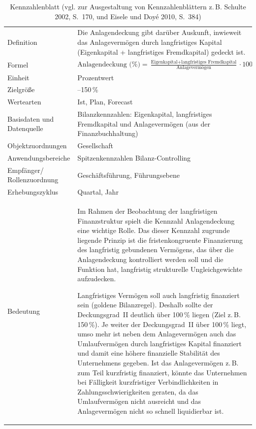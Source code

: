 \begin{table}[htbp]
  \centering
  \caption[Kennzahlenblatt]{Kennzahlenblatt (vgl. zur Ausgestaltung von Kennzahlenblättern z.\,B. Schulte 2002, S.~170, und Eisele und Doyé 2010, S.~384)}
  \label{tab:Kennzahlenblatt}
  \small
  \begin{tabularx}{\textwidth}{@{}>{\raggedright\arraybackslash}p{3.3cm}>{\raggedright\arraybackslash}X@{}}
    \toprule
    \multicolumn{2}{@{}l}{\textbf{Kennzahl: Anlagendeckung (\%)}} \\
    \midrule
    Definition & Die Anlagendeckung gibt darüber Auskunft, inwieweit das Anlagevermögen durch langfristiges Kapital (Eigenkapital + langfristiges Fremdkapital) gedeckt ist. \\
    \addlinespace
    Formel & $\displaystyle \text{Anlagendeckung (\%)} = \frac{\text{Eigenkapital} + \text{langfristiges Fremdkapital}}{\text{Anlagevermögen}} \cdot 100$ \\
    \addlinespace
    Einheit & Prozentwert \\
    Zielgröße & 110--150\,\% \\
    Wertearten & Ist, Plan, Forecast \\
    Basisdaten und Datenquelle & Bilanzkennzahlen: Eigenkapital, langfristiges Fremdkapital und Anlagevermögen (aus der Finanzbuchhaltung) \\
    Objektzuordnungen & Gesellschaft \\
    Anwendungsbereiche & Spitzenkennzahlen Bilanz-Controlling \\
    Empfänger/ Rollenzuordnung & Geschäftsführung, Führungsebene \\
    Erhebungszyklus & Quartal, Jahr \\
    \addlinespace
    Bedeutung & Im Rahmen der Beobachtung der langfristigen Finanzstruktur spielt die Kennzahl Anlagendeckung eine wichtige Rolle. Das dieser Kennzahl zugrunde liegende Prinzip ist die fristenkongruente Finanzierung des langfristig gebundenen Vermögens, das über die Anlagendeckung kontrolliert werden soll und die Funktion hat, langfristig strukturelle Ungleichgewichte aufzudecken.

    Langfristiges Vermögen soll auch langfristig finanziert sein (goldene Bilanzregel). Deshalb sollte der Deckungsgrad~II deutlich über 100\,\% liegen (Ziel z.\,B. 150\,\%). Je weiter der Deckungsgrad~II über 100\,\% liegt, umso mehr ist neben dem Anlagevermögen auch das Umlaufvermögen durch langfristiges Kapital finanziert und damit eine höhere finanzielle Stabilität des Unternehmens gegeben. Ist das Anlagevermögen z.\,B. zum Teil kurzfristig finanziert, könnte das Unternehmen bei Fälligkeit kurzfristiger Verbindlichkeiten in Zahlungsschwierigkeiten geraten, da das Umlaufvermögen nicht ausreicht und das Anlagevermögen nicht so schnell liquidierbar ist. \\
    \bottomrule
  \end{tabularx}
\end{table}
